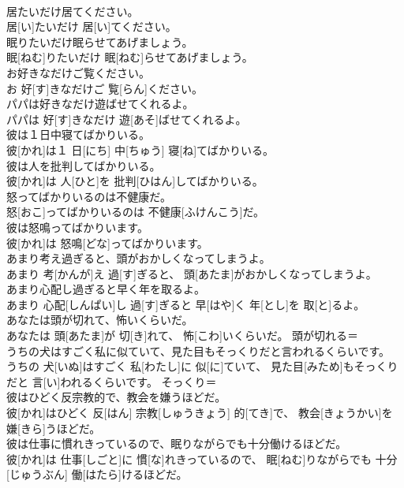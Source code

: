 \documentclass[8pt]{extreport}
\begin{document}
\begin{CJK}{UTF8}{min}
\\	居たいだけ居てください。	
\\	居[い]たいだけ 居[い]てください。	
\\	眠りたいだけ眠らせてあげましょう。	
\\	眠[ねむ]りたいだけ 眠[ねむ]らせてあげましょう。	
\\	お好きなだけご覧ください。	
\\	お 好[す]きなだけご 覧[らん]ください。	
\\	パパは好きなだけ遊ばせてくれるよ。	
\\	パパは 好[す]きなだけ 遊[あそ]ばせてくれるよ。	
\\	彼は１日中寝てばかりいる。	
\\	彼[かれ]は１ 日[にち] 中[ちゅう] 寝[ね]てばかりいる。	
\\	彼は人を批判してばかりいる。	
\\	彼[かれ]は 人[ひと]を 批判[ひはん]してばかりいる。	
\\	怒ってばかりいるのは不健康だ。	
\\	怒[おこ]ってばかりいるのは 不健康[ふけんこう]だ。	
\\	彼は怒鳴ってばかりいます。	
\\	彼[かれ]は 怒鳴[どな]ってばかりいます。	
\\	あまり考え過ぎると、頭がおかしくなってしまうよ。	
\\	あまり 考[かんが]え 過[す]ぎると、 頭[あたま]がおかしくなってしまうよ。	
\\	あまり心配し過ぎると早く年を取るよ。	
\\	あまり 心配[しんぱい]し 過[す]ぎると 早[はや]く 年[とし]を 取[と]るよ。	
\\	あなたは頭が切れて、怖いくらいだ。	
\\	あなたは 頭[あたま]が 切[き]れて、 怖[こわ]いくらいだ。	頭が切れる＝ 
\\	うちの犬はすごく私に似ていて、見た目もそっくりだと言われるくらいです。	
\\	うちの 犬[いぬ]はすごく 私[わたし]に 似[に]ていて、 見た目[みため]もそっくりだと 言[い]われるくらいです。	そっくり＝ 
\\	彼はひどく反宗教的で、教会を嫌うほどだ。	
\\	彼[かれ]はひどく 反[はん] 宗教[しゅうきょう] 的[てき]で、 教会[きょうかい]を 嫌[きら]うほどだ。	
\\	彼は仕事に慣れきっているので、眠りながらでも十分働けるほどだ。	
\\	彼[かれ]は 仕事[しごと]に 慣[な]れきっているので、 眠[ねむ]りながらでも 十分[じゅうぶん] 働[はたら]けるほどだ。	

\end{CJK}
\end{document}
